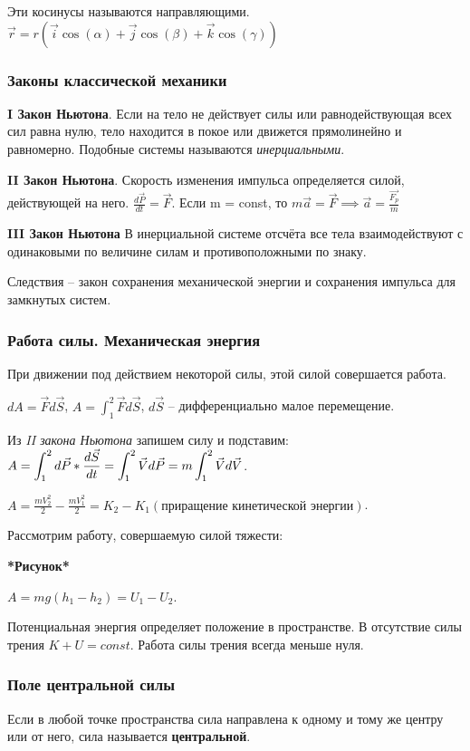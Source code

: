 \documentclass[a4paper,oneside]{article}
\theoremstyle{definition}
\theoremstyle{definition}
\theoremstyle{definition}
\newcommand{\tbf}[1]{\textbf{#1}}
\newcommand{\dsint}{\displaystyle\int}
\begin{document}
Эти косинусы называются направляющими. $\vec{r} = r (\vec{i}\cos(\alpha) + \vec{j}\cos(\beta) + \vec{k}\cos(\gamma))$

\subsubsection{Законы классической механики}

\tbf{I Закон Ньютона}. Если на тело не действует силы или равнодействующая всех сил равна нулю,
тело находится в покое или движется прямолинейно и равномерно. Подобные системы называются \textit{инерциальными}.

\tbf{II Закон Ньютона}. Скорость изменения импульса определяется силой, действующей на него. $\frac{d \vec{P}}{dt} = \vec{F}$.
Если m = const, то $m\vec{a}=\vec{F} \implies \vec{a}=\frac{\vec{F_p}}{m}$

\tbf{III Закон Ньютона} В инерциальной системе отсчёта все тела взаимодействуют с одинаковыми по величине силам
и противоположными по знаку.

Следствия -- закон сохранения механической энергии и сохранения импульса для замкнутых систем.


\subsubsection{Работа силы. Механическая энергия}
При движении под действием некоторой силы, этой силой совершается работа.

$dA = \vec{F} d \vec{S}$, $A = \dsint_1^2 \vec{F} d \vec{S}$, $d\vec{S}$ -- дифференциально малое перемещение. 

Из \textit{II закона Ньютона} запишем силу и подставим: 
$A = \displaystyle\dsint_1^2 d \vec{P} * \frac{d \vec{S}}{dt} = \dsint_1^2 \vec{V} d \vec{P} = m \dsint_1^2 \vec{V} d \vec{V}$.

$A = \frac{m V_2^2}{2} - \frac{m V_1^2}{2} = K_2 - K_1 (\text{приращение кинетической энергии})$.

Рассмотрим работу, совершаемую силой тяжести:

\tbf{*Рисунок*}

$A = mg(h_1 - h_2) = U_1 - U_2$.

Потенциальная энергия определяет положение в пространстве. В отсутствие силы трения $K + U = const$. 
Работа силы трения всегда меньше нуля.

\subsubsection{Поле центральной силы}
Если в любой точке пространства сила направлена к одному и тому же центру или от него,
сила называется \tbf{центральной}.
\end{document}
